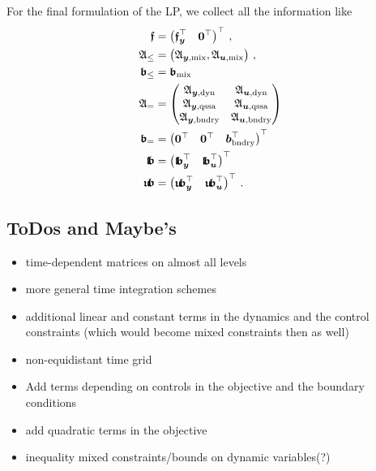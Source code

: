\documentclass{article}
\newcommand{\tp}{\top}%
\newcommand{\vectorfont}[1]{\boldsymbol{#1}}%
\newcommand{\greekvectorfont}[1]{\boldsymbol{#1}}%
\newcommand{\matrixfont}[1]{\mathbf{#1}}%
\newcommand{\bvec}{\vectorfont{b}}
\newcommand{\uvec}{\vectorfont{u}}
\newcommand{\yvec}{\vectorfont{y}}
\newcommand{\bfrakvec}{\vectorfont{\mathfrak{b}}}
\newcommand{\ffrakvec}{\vectorfont{\mathfrak{f}}}
\newcommand{\nullvec}{\greekvectorfont{0}}
\newcommand{\lbfrakvec}{\vectorfont{\mathfrak{l\negthinspace b}}}
\newcommand{\ubfrakvec}{\vectorfont{\mathfrak{u\negthinspace b}}}
\newcommand{\Afrakmat}{\matrixfont{\mathfrak{A}}}
\begin{document}
For the final formulation of the LP, we collect all the information like
\begin{align*}
\ffrakvec &= \begin{pmatrix} \ffrakvec_{\yvec}^{\tp} & \nullvec^{\tp} \end{pmatrix}^{\tp}\,,
\\
\Afrakmat_{\leq} &= \begin{pmatrix} \Afrakmat_{\yvec,\mathrm{mix}}, \Afrakmat_{\uvec,\mathrm{mix}} \end{pmatrix}\,,
\\
\bfrakvec_{\leq} &= \bfrakvec_{\mathrm{mix}}
\\
\Afrakmat_{=} &= \begin{pmatrix} 
                     \Afrakmat_{\yvec, \mathrm{dyn}} & \Afrakmat_{\uvec, \mathrm{dyn}} \\
                     \Afrakmat_{\yvec, \mathrm{qssa}} & \Afrakmat_{\uvec, \mathrm{qssa}} \\
                     \Afrakmat_{\yvec, \mathrm{bndry}} & \Afrakmat_{\uvec, \mathrm{bndry}}
                 \end{pmatrix}
\\
\bfrakvec_{=} &= \begin{pmatrix} \nullvec^{\tp} & \nullvec^{\tp} & \bvec_{\mathrm{bndry}}^{\tp}\end{pmatrix}^{\tp}
\\
\lbfrakvec &= \begin{pmatrix} \lbfrakvec_{\yvec}^{\tp} & \lbfrakvec_{\uvec}^{\tp} \end{pmatrix}^{\tp}
\\
\ubfrakvec &= \begin{pmatrix} \ubfrakvec_{\yvec}^{\tp} & \ubfrakvec_{\uvec}^{\tp} \end{pmatrix}^{\tp}\,.
\end{align*}




\appendix

\subsection*{ToDos and Maybe's}

\begin{itemize}
  \item time-dependent matrices on almost all levels
	\item more general time integration schemes
	\item additional linear and constant terms in the dynamics and the control constraints (which would become mixed constraints then as well)
	\item non-equidistant time grid
	\item Add terms depending on controls in the objective and the boundary conditions
	\item add quadratic terms in the objective
	\item inequality mixed constraints/bounds on dynamic variables(?)
\end{itemize}
\end{document}
